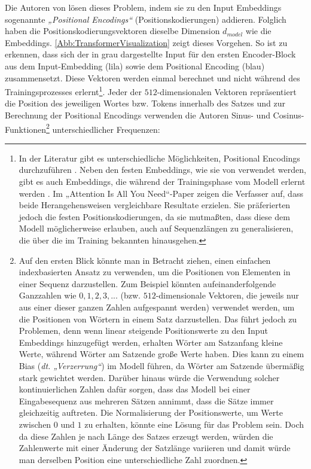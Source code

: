 Die Autoren von \cite{Attention_is_all_you_need} lösen dieses Problem, indem sie zu den Input Embeddings sogenannte \emph{„Positional Encodings“} (Positionskodierungen) addieren. Folglich haben die Positionskodierungsvektoren dieselbe Dimension $d_{model}$ wie die Embeddings. \cref{Abb:TransformerVisualization} zeigt dieses Vorgehen. So ist zu erkennen, dass sich der in grau dargestellte Input für den ersten Encoder-Block aus dem Input-Embedding (lila) sowie dem Positional Encoding (blau) zusammensetzt. Diese Vektoren werden einmal berechnet und nicht während des Trainingsprozesses erlernt\footnote{In der Literatur gibt es unterschiedliche Möglichkeiten, Positional Encodings durchzuführen \cite{Formal_Algorithms_for_Transformers_DeepMind}\cite{Goodfellow_Handbuch}\cite{PositionalEncodingTransformers}. Neben den festen Embeddings, wie sie von \cite{Attention_is_all_you_need} verwendet werden, gibt es auch Embeddings, die während der Trainingsphase vom Modell erlernt werden \cite{Conv_Seq2Seq_Learning}. Im „Attention Is All You Need“-Paper zeigen die Verfasser auf, dass beide Herangehensweisen vergleichbare Resultate erzielen. Sie präferierten jedoch die festen Positionskodierungen, da sie mutmaßten, dass diese dem Modell möglicherweise erlauben, auch auf Sequenzlängen zu generalisieren, die über die im Training bekannten hinausgehen.}. Jeder der $512$-dimensionalen Vektoren repräsentiert die Position des jeweiligen Wortes bzw. Tokens innerhalb des Satzes und zur Berechnung der Positional Encodings verwenden die Autoren Sinus- und Cosinus-Funktionen\footnote{Auf den ersten Blick könnte man in Betracht ziehen, einen einfachen indexbasierten Ansatz zu verwenden, um die Positionen von Elementen in einer Sequenz darzustellen. Zum Beispiel könnten aufeinanderfolgende Ganzzahlen wie $0, 1, 2, 3, ...$ (bzw. $512$-dimensionale Vektoren, die jeweils nur aus einer dieser ganzen Zahlen aufgespannt werden) verwendet werden, um die Positionen von Wörtern in einem Satz darzustellen. Das führt jedoch zu Problemen, denn wenn linear steigende Positionswerte zu den Input Embeddings hinzugefügt werden, erhalten Wörter am Satzanfang kleine Werte, während Wörter am Satzende große Werte haben. Dies kann zu einem Bias (\emph{dt. „Verzerrung“}) im Modell führen, da Wörter am Satzende übermäßig stark gewichtet werden. Darüber hinaus würde die Verwendung solcher kontinuierlichen Zahlen dafür sorgen, dass das Modell bei einer Eingabesequenz aus mehreren Sätzen annimmt, dass die Sätze immer gleichzeitig auftreten. Die Normalisierung der Positionswerte, um Werte zwischen $0$ und $1$ zu erhalten, könnte eine Lösung für das Problem sein. Doch da diese Zahlen je nach Länge des Satzes erzeugt werden, würden die Zahlenwerte mit einer Änderung der Satzlänge variieren und damit würde man derselben Position eine unterschiedliche Zahl zuordnen.} unterschiedlicher Frequenzen: 


